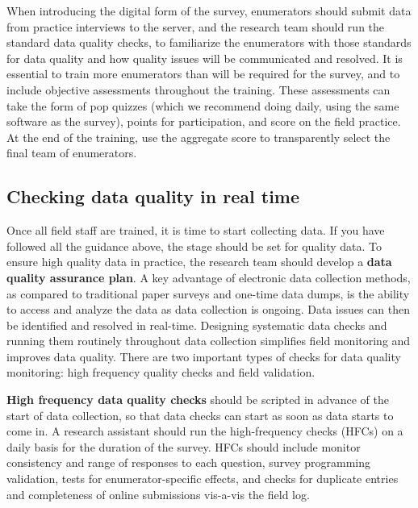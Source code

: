 When introducing the digital form of the survey,
enumerators should submit data from practice interviews to the server,
and the research team should run the standard data quality checks,
to familiarize the enumerators with those standards for data quality
and how quality issues will be communicated and resolved.
It is essential to train more enumerators than will be required
for the survey,
and to include objective assessments throughout the training.
These assessments can take the form of pop quizzes (which we recommend doing daily,
using the same software as the survey), points for participation,
and score on the field practice.
At the end of the training, use the aggregate score to transparently select the final team of enumerators.


\subsection{Checking data quality in real time}
Once all field staff are trained, it is time to start collecting data.
If you have followed all the guidance above, the stage should be set for quality data.
To ensure high quality data in practice,
the research team should develop a \textbf{data quality assurance plan}.
A key advantage of electronic data collection methods,
as compared to traditional paper surveys and one-time data dumps,
is the ability to access and analyze the data as data collection is ongoing.
Data issues can then be identified and resolved in real-time.
Designing systematic data checks and running them routinely throughout data collection
simplifies field monitoring and improves data quality.
There are two important types of checks for data quality monitoring:
high frequency quality checks and field validation.

\textbf{High frequency data quality checks} should be scripted
in advance of the start of data collection,
so that data checks can start as soon as data starts to come in.
A research assistant should run the high-frequency checks (HFCs) on a daily basis
for the duration of the survey.
HFCs should include monitor consistency and range of responses to each question,
survey programming validation, tests for enumerator-specific effects,
and checks for duplicate entries and completeness of online submissions vis-a-vis the field log.

